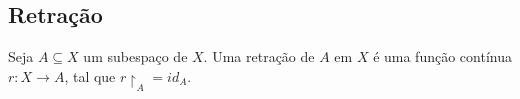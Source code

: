 \subsection{Retração}
\label{retração-def}
\begin{defi}[Retração]
Seja $A \subseteq X$ um subespaço de $X$. Uma retração de $A$ em $X$ é uma função contínua $r:X \to A$, tal que $r\restriction_A = id_A$.	 
\end{defi}


